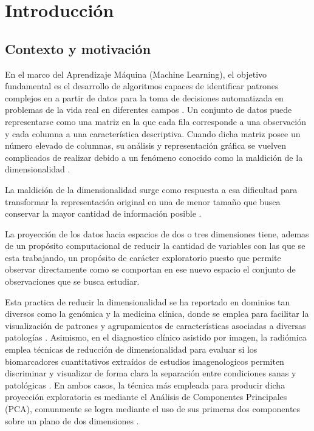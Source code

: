 
\chapter{Introducción}
\label{chap:introduccion}

\section{Contexto y motivación}

En el marco del Aprendizaje Máquina (Machine Learning), el objetivo fundamental es el desarrollo de algoritmos capaces de identificar patrones complejos en a partir de datos para la toma de decisiones automatizada en problemas de la vida real en diferentes campos \cite{bharadiya2023tutorial}. Un conjunto de datos puede representarse como una matriz en la que cada fila corresponde a una observación y cada columna a una característica descriptiva. Cuando dicha matriz posee un número elevado de columnas, su análisis y representación gráfica se vuelven complicados de realizar debido a un fenómeno conocido como la maldición de la dimensionalidad \cite{venkat2018curse}. 

La maldición de la dimensionalidad surge como respuesta a esa dificultad para transformar la representación original en una de menor tamaño que busca conservar la mayor cantidad de información posible \cite{nguyen2019ten}.

La proyección de los datos hacia espacios de dos o tres dimensiones tiene, ademas de un propósito computacional de reducir la cantidad de variables con las que se esta trabajando, un propósito de carácter exploratorio puesto que permite observar directamente como se comportan en ese nuevo espacio el conjunto de observaciones que se busca estudiar. 

Esta practica de reducir la dimensionalidad se ha reportado en dominios tan diversos como la genómica y la medicina clínica, donde se emplea para facilitar la visualización de patrones y agrupamientos de características asociadas a diversas patologías \cite{bruno2020data}. Asimismo, en el diagnostico clínico asistido por imagen, la radiómica emplea técnicas de reducción de dimensionalidad para evaluar si los biomarcadores cuantitativos extraídos de estudios imagenologicos permiten discriminar y visualizar de forma clara la separación entre condiciones sanas y patológicas \cite{neha2026radiomics}. En ambos casos, la técnica más empleada para producir dicha proyección exploratoria es mediante el Análisis de Componentes Principales (PCA), comunmente se logra mediante el uso de sus primeras dos componentes sobre un plano de dos dimensiones \cite{kabir2023performance}.

